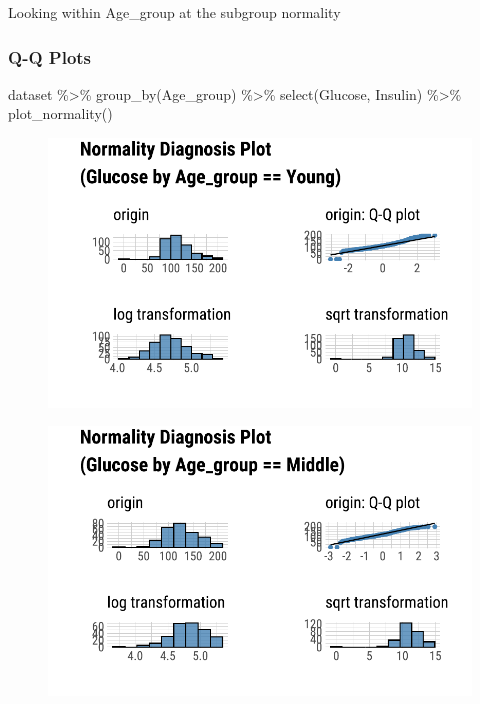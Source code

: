 \documentclass[
  letterpaper,
  DIV=11,
  numbers=noendperiod]{scrreprt}
\newenvironment{Shaded}{\begin{snugshade}}{\end{snugshade}}
\newcommand{\FunctionTok}[1]{\textcolor[rgb]{0.28,0.35,0.67}{#1}}
\newcommand{\NormalTok}[1]{\textcolor[rgb]{0.00,0.23,0.31}{#1}}
\newcommand{\SpecialCharTok}[1]{\textcolor[rgb]{0.37,0.37,0.37}{#1}}
\begin{document}
Looking within Age\_group at the subgroup normality

\hypertarget{q-q-plots-3}{%
\subsubsection{Q-Q Plots}\label{q-q-plots-3}}

\begin{Shaded}
\begin{Highlighting}[]
\NormalTok{dataset }\SpecialCharTok{\%\textgreater{}\%}
  \FunctionTok{group\_by}\NormalTok{(Age\_group) }\SpecialCharTok{\%\textgreater{}\%}
  \FunctionTok{select}\NormalTok{(Glucose, Insulin) }\SpecialCharTok{\%\textgreater{}\%}
  \FunctionTok{plot\_normality}\NormalTok{()}
\end{Highlighting}
\end{Shaded}

\begin{figure}[H]

{\centering \includegraphics{./TransformingLikeDataTrans_files/figure-pdf/unnamed-chunk-6-1.pdf}

}

\end{figure}

\begin{figure}[H]

{\centering \includegraphics{./TransformingLikeDataTrans_files/figure-pdf/unnamed-chunk-6-2.pdf}

}

\end{figure}
\end{document}
